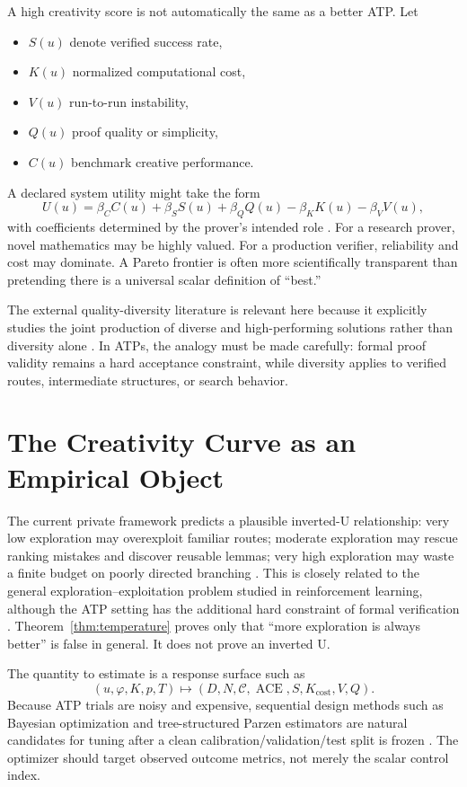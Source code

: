 \documentclass[11pt]{article}
\theoremstyle{datatheorem}
\theoremstyle{definition}
\newcommand{\cY}{\mathcal{C}}
\begin{document}
A high creativity score is not automatically the same as a better ATP. Let
\begin{itemize}
\item $S(u)$ denote verified success rate,
\item $K(u)$ normalized computational cost,
\item $V(u)$ run-to-run instability,
\item $Q(u)$ proof quality or simplicity,
\item $C(u)$ benchmark creative performance.
\end{itemize}
A declared system utility might take the form
\[
U(u)=\beta_C C(u)+\beta_SS(u)+\beta_QQ(u)-\beta_KK(u)-\beta_VV(u),
\]
with coefficients determined by the prover's intended role \cite{tennesonC2}. For a research prover, novel mathematics may be highly valued. For a production verifier, reliability and cost may dominate. A Pareto frontier is often more scientifically transparent than pretending there is a universal scalar definition of ``best.''

The external quality-diversity literature is relevant here because it explicitly studies the joint production of diverse and high-performing solutions rather than diversity alone \cite{pugh2016,mouret2015}. In ATPs, the analogy must be made carefully: formal proof validity remains a hard acceptance constraint, while diversity applies to verified routes, intermediate structures, or search behavior.

\section{The Creativity Curve as an Empirical Object}

The current private framework predicts a plausible inverted-U relationship: very low exploration may overexploit familiar routes; moderate exploration may rescue ranking mistakes and discover reusable lemmas; very high exploration may waste a finite budget on poorly directed branching \cite{tennesonC1,tennesonCombined}. This is closely related to the general exploration--exploitation problem studied in reinforcement learning, although the ATP setting has the additional hard constraint of formal verification \cite{sutton2018}. Theorem~\ref{thm:temperature} proves only that ``more exploration is always better'' is false in general. It does not prove an inverted U.

The quantity to estimate is a response surface such as
\[
(u,\varphi,K,p,T)\longmapsto
\left(D,N,\cY,\operatorname{ACE},S,K_{\mathrm{cost}},V,Q\right).
\]
Because ATP trials are noisy and expensive, sequential design methods such as Bayesian optimization and tree-structured Parzen estimators are natural candidates for tuning after a clean calibration/validation/test split is frozen \cite{snoek2012,bergstra2011}. The optimizer should target observed outcome metrics, not merely the scalar control index.
\end{document}
